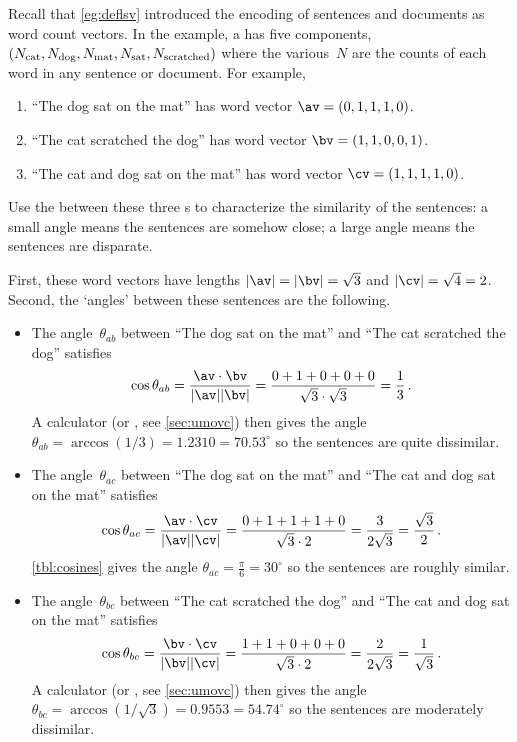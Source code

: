 \begin{example} \label{eg:lsidot}
Recall that \cref{eg:deflsv} introduced the encoding of sentences and documents as word count vectors.
In the example, a  has five components, \(\sloppy(N_{\text{cat}},N_{\text{dog}},N_{\text{mat}},N_{\text{sat}},N_{\text{scratched}})\) where the various~\(N\) are the counts of each word in any sentence or document. For example,
\begin{enumerate}
\item ``The dog sat on the mat'' has word vector \(\av=(0,1,1,1,0)\).
\item ``The cat scratched the dog'' has word vector \(\bv=(1,1,0,0,1)\).
\item ``The cat and dog sat on the mat'' has word vector \(\cv=(1,1,1,1,0)\).
\end{enumerate}
Use the  between these three s to characterize the similarity of the sentences: a small angle means the sentences are somehow close; a large angle means the sentences are disparate.
\begin{solution} 
First, these word vectors have lengths \(|\av|=|\bv|=\sqrt3\) and \(|\cv|=\sqrt4=2\).
Second, the `angles' between these sentences are the following.
\begin{itemize}
\item The angle~\(\theta_{ab}\) between ``The dog sat on the mat'' and ``The cat scratched the dog'' satisfies
\begin{equation*}
\cos\theta_{ab}=\frac{\av\cdot\bv}{|\av||\bv|}
=\frac{0+1+0+0+0}{\sqrt3\cdot\sqrt3}=\frac13\,.
\end{equation*}
A calculator  (or \script, see \cref{sec:umovc}) then gives the angle \(\theta_{ab} =\arccos(1/3) =1.2310=70.53^\circ\) so the sentences are quite dissimilar.

\item The angle~\(\theta_{ac}\) between ``The dog sat on the mat'' and ``The cat and dog sat on the mat'' satisfies
\begin{equation*}
\cos\theta_{ac}=\frac{\av\cdot\cv}{|\av||\cv|}
=\frac{0+1+1+1+0}{\sqrt3\cdot2}=\frac3{2\sqrt3}=\frac{\sqrt3}2\,.
\end{equation*}
\cref{tbl:cosines} gives the angle \(\theta_{ac}=\tfrac\pi6=30^\circ\) so the sentences are roughly similar.

\item The angle~\(\theta_{bc}\) between ``The cat scratched the dog'' and ``The cat and dog sat on the mat'' satisfies
\begin{equation*}
\cos\theta_{bc}=\frac{\bv\cdot\cv}{|\bv||\cv|}
=\frac{1+1+0+0+0}{\sqrt3\cdot2}=\frac2{2\sqrt3}=\frac1{\sqrt3}\,.
\end{equation*}
A calculator  (or \script, see \cref{sec:umovc}) then gives the angle \(\theta_{bc} =\arccos(1/\sqrt3) =0.9553 =54.74^\circ\) so the sentences are moderately dissimilar.


\end{itemize}
\end{solution}
\end{example}
